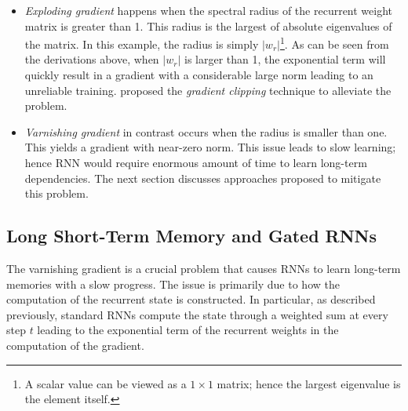 %
%
%
\begin{itemize}
	\item \textit{Exploding gradient} happens when the spectral radius of the recurrent weight matrix is greater than 1. This radius is the largest of absolute eigenvalues of the matrix. In this example, the radius is simply $|w_r|$\footnote{A scalar value can be viewed as a $1 \times 1$ matrix; hence the largest eigenvalue is the element itself.}. As can be seen from the derivations above, when $|w_r|$ is larger than 1, the exponential term will quickly result in a gradient with a considerable large norm leading to an unreliable training. \citet{Pascanudifficultytrainingrecurrent2013} proposed the \textit{gradient clipping} technique to alleviate the problem.
	\item \textit{Varnishing gradient} in contrast occurs when the radius is smaller than one. This yields a gradient with near-zero norm. This issue leads to slow learning; hence RNN would require enormous amount of time to learn long-term dependencies. The next section discusses approaches proposed to mitigate this problem.
\end{itemize}



\subsection{Long Short-Term Memory and Gated RNNs}
The varnishing gradient is a crucial problem that causes RNNs to learn long-term memories with a slow progress. The issue is primarily due to  how the computation of the recurrent state  is constructed. In particular, as described previously, standard RNNs compute the state through a weighted sum at every step $t$ leading to the exponential term of the recurrent weights in the computation of the gradient.

